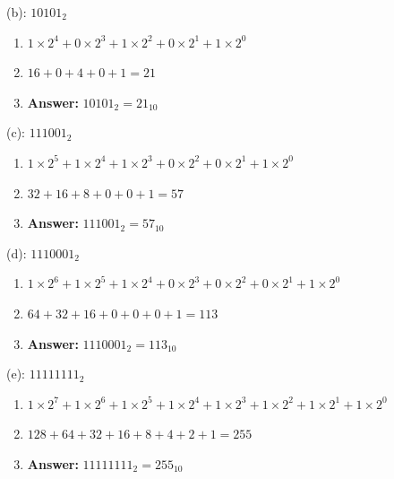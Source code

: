 \documentclass{article}
\begin{document}
\vspace*{0.5cm}

\noindent (b): $10101_2$

\begin{enumerate}
    \item $1 \times 2^4 + 0 \times 2^3 + 1 \times 2^2 + 0 \times 2^1 + 1 \times 2^0$
    \item $16 + 0 + 4 + 0 + 1 = 21$
    \item \textbf{Answer:} $10101_2 = 21_{10}$
\end{enumerate}

\vspace*{0.5cm}

\noindent (c): $111001_2$

\begin{enumerate}
    \item $1 \times 2^5 + 1 \times 2^4 + 1 \times 2^3 + 0 \times 2^2 + 0 \times 2^1 + 1 \times 2^0$
    \item $32 + 16 + 8 + 0 + 0 + 1 = 57$
    \item \textbf{Answer:} $111001_2 = 57_{10}$
\end{enumerate}

\vspace*{0.5cm}

\noindent (d): $1110001_2$

\begin{enumerate}
    \item $1 \times 2^6 + 1 \times 2^5 + 1 \times 2^4 + 0 \times 2^3 + 0 \times 2^2 + 0 \times 2^1 + 1 \times 2^0$
    \item $64 + 32 + 16 + 0 + 0 + 0 + 1 = 113$
    \item \textbf{Answer:} $1110001_2 = 113_{10}$
\end{enumerate}

\vspace*{0.5cm}

\noindent (e): $11111111_2$

\begin{enumerate}
    \item $1 \times 2^7 + 1 \times 2^6 + 1 \times 2^5 + 1 \times 2^4 + 1 \times 2^3 + 1 \times 2^2 + 1 \times 2^1 + 1 \times 2^0$
    \item $128 + 64 + 32 + 16 + 8 + 4 + 2 + 1 = 255$
    \item \textbf{Answer:} $11111111_2 = 255_{10}$
\end{enumerate}
\end{document}
